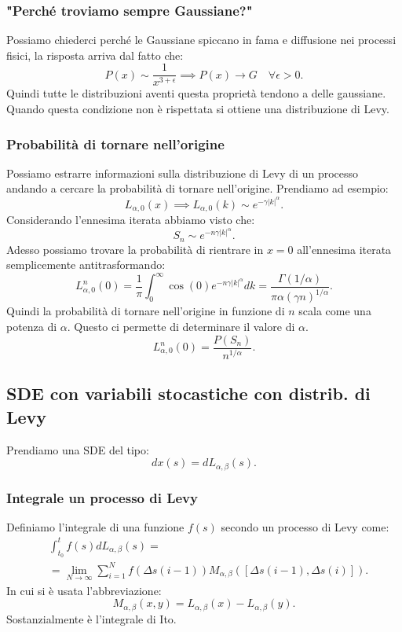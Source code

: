\subsubsection{"Perché troviamo sempre Gaussiane?"}%
\label{subsub:"Perché troviamo sempre Gaussiane?"}
Possiamo chiederci perché le Gaussiane spiccano in fama e diffusione nei processi fisici, la risposta arriva dal fatto che:
\[
    P(x) \sim \frac{1}{x^{3+\epsilon}} \implies P(x) \to G \quad \forall \epsilon >0
.\] 
Quindi tutte le distribuzioni aventi questa proprietà tendono a delle gaussiane. Quando questa condizione non è rispettata si ottiene una distribuzione di Levy.
\subsubsection{Probabilità di tornare nell'origine}%
\label{subsub:Probabilità di tornare nell'origine}
Possiamo estrarre informazioni sulla distribuzione di Levy di un processo andando a cercare la probabilità di tornare nell'origine. Prendiamo ad esempio:
\[
    L_{\alpha,0}(x) \implies  L_{\alpha,0}(k) \sim e^{-\gamma\left|k\right|^\alpha}
.\] 
Considerando l'ennesima iterata abbiamo visto che:
\[
    S_n \sim e^{-n\gamma\left|k\right|^\alpha}
.\] 
Adesso possiamo trovare la probabilità di rientrare in $x=0$  all'ennesima iterata semplicemente antitrasformando:
\[
    L^n_{\alpha,0}(0) = \frac{1}{\pi}\int_0^{\infty}\cos (0) e^{-n\gamma\left|k\right|^\alpha}dk = 
    \frac{\Gamma (1 / \alpha) }{\pi\alpha\left(\gamma n\right)^{1 / \alpha}}
.\] 
Quindi la probabilità di tornare nell'origine in funzione di $n$  scala come una potenza di $\alpha$. Questo ci permette di determinare il valore di $\alpha$.
\[
    L^n_{\alpha,0}(0) = \frac{P(S_n)}{n^{1 / \alpha}} 
.\] 
\subsection{SDE con variabili stocastiche con distrib. di Levy}%
\label{sub:SDE con variabili stocastiche con distrib. di Levy}
Prendiamo una SDE del tipo:
\[
    dx(s)  = dL_{\alpha,\beta  }(s) 
.\] 
\subsubsection{Integrale un processo di Levy}%
\label{subsub:Integrale un processo di Levy}
Definiamo l'integrale di una funzione $f(s)$ secondo un processo di Levy come:
\[\begin{aligned}
    &\int_{t_0}^{t} f(s) dL_{\alpha,\beta  }(s) = \\
    &=\lim_{N \to \infty} \sum_{i=1}^{N} f(\Delta s(i-1) ) M_{\alpha,\beta  }\left(\left[\Delta s(i-1), \Delta s(i)\right]\right)
.\end{aligned}\]
In cui si è usata l'abbreviazione:
\[
M_{\alpha,\beta}(x,y) = L_{\alpha,\beta}(x)-L_{\alpha,\beta}(y)
.\] 
Sostanzialmente è l'integrale di Ito.

